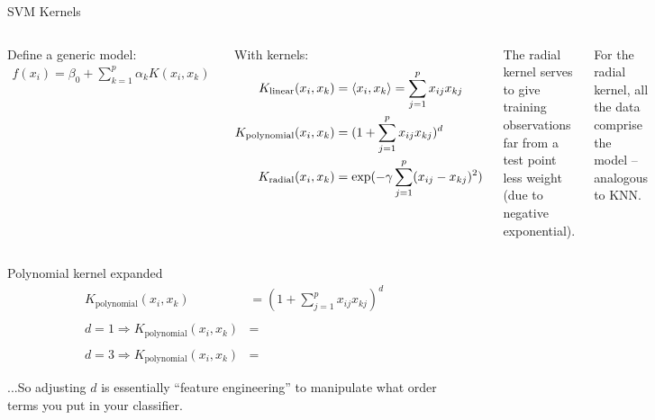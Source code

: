 \documentclass[mathserif, aspectratio=169]{beamer}
\begin{document}
\begin{frame}{SVM Kernels}
	\begin{columns}

		Define a generic model:
		\begin{align*}
			f(x_i) = \beta_0+\sum_{k=1}^p \alpha_k K(x_i,x_k)
		\end{align*}

		With kernels:
		\begin{align*}
			K_\text{linear}(x_i,x_k)     & = \braket{x_i,x_k} = \sum_{j=1}^px_{ij}x_{kj} \\
			K_\text{polynomial}(x_i,x_k) & = (1+ \sum_{j=1}^px_{ij}x_{kj})^d             \\
			K_\text{radial}(x_i,x_k)     & = \exp(-\gamma \sum_{j=1}^p(x_{ij}-x_{kj})^2) \\
		\end{align*}

		

		The radial kernel serves to give training observations far from a test point less weight (due to negative exponential).

		\vspace{5mm}

		For the radial kernel, all the data comprise the model -- analogous to KNN.
	\end{columns}

\end{frame}


\begin{frame}{Polynomial kernel expanded}
	\begin{align*}
		K_\text{polynomial}(x_i,x_k) & = (1+ \sum_{j=1}^px_{ij}x_{kj})^d \\\\
		d = 1 \Rightarrow K_\text{polynomial}(x_i,x_k) &= \\\\
		d = 3 \Rightarrow K_\text{polynomial}(x_i,x_k) &= 
	\end{align*}

\vspace*{10mm}
	...So adjusting $d$ is essentially ``feature engineering'' to manipulate what order terms you put in your classifier.	
\end{frame}
\end{document}
